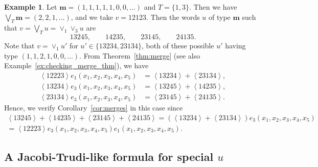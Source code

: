 \documentclass[reqno]{amsart}
\newcommand{\0}{\phantom{c}}
\newcommand{\swt}[1]{\left\langle #1 \right\rangle} %
\newcommand{\mm}{\mathbf{m}}
\theoremstyle{plain}
\theoremstyle{definition}
\newtheorem{example}[thm]{Example}
\numberwithin{equation}{section}
\begin{document}
\begin{example}
Let $\mm = (1,1,1,1,1,0,0,\ldots)$ and $T = \{1,3\}$.
Then we have $\bigvee_T \mm = (2,2,1,\ldots)$, and we take $v = 12123$.
Then the words $u$ of type $\mm$ such that $v = \bigvee_T u = \vee_1 \vee_3 u$ are
\[
13245,
\qquad
14235,
\qquad
23145,
\qquad
24135.
\]
Note that $v = \vee_1 u'$ for $u' \in \{13234, 23134\}$, both of these possible $u'$ having type $(1, 1, 2, 1, 0, 0, \ldots)$.
From Theorem~\ref{thm:merge} (see also Example~\ref{ex:checking_merge_thm}), we have
\begin{align*}
\swt{12223} e_1(x_1, x_2, x_3, x_4, x_5) & = \swt{13234} + \swt{23134},
\\
\swt{13234} e_3(x_1, x_2, x_3, x_4, x_5) & = \swt{13245} + \swt{14235},
\\
\swt{23134} e_3(x_1, x_2, x_3, x_4, x_5) & = \swt{23145} + \swt{24135}.
\end{align*}
Hence, we verify Corollary~\ref{cor:merges} in this case since
\begin{gather*}
\swt{13245} + \swt{14235} + \swt{23145} + \swt{24135}
 = (\swt{13234} + \swt{23134}) e_3(x_1, x_2, x_3, x_4, x_5)
\\ = \swt{12223} e_3(x_1, x_2, x_3, x_4, x_5) e_1(x_1, x_2, x_3, x_4, x_5).
\end{gather*}
\end{example}


\subsection{A Jacobi-Trudi-like formula for special \texorpdfstring{$u$}{u}}
\label{subsec:JT_formula}
\end{document}
